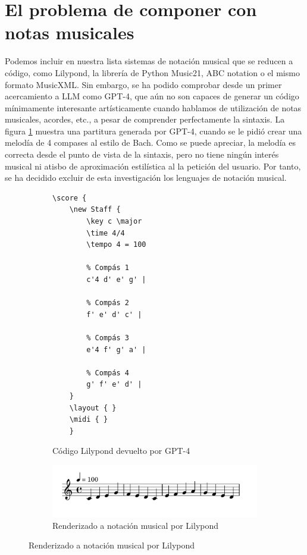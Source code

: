     
\section{El problema de componer con notas musicales}

Podemos incluir en nuestra lista sistemas de notación musical que se reducen a código, como Lilypond, la librería de Python Music21, ABC notation o el mismo formato MusicXML. Sin embargo, se ha podido comprobar desde un primer acercamiento a LLM como GPT-4, que aún no son capaces de generar un código mínimamente interesante artísticamente cuando hablamos de utilización de notas musicales, acordes, etc., a pesar de comprender perfectamente la sintaxis. La figura \ref{fig:melodia_bach} muestra una partitura generada por GPT-4, cuando se le pidió crear una melodía de 4 compases al estilo de Bach. Como se puede apreciar, la melodía es correcta desde el punto de vista de la sintaxis, pero no tiene ningún interés musical ni atisbo de aproximación estilística al la petición del usuario. Por tanto, se ha decidido excluir de esta investigación los lenguajes de notación musical.

\begin{figure}[h]
    \caption[Melodía de 4 compases generada por GPT-4, al estilo de Bach]{Melodía de 4 compases generada por GPT-4, al estilo de Bach. El LLM la entregó en formato Lilypond.}
    \centering
    \begin{subfigure}{.48\textwidth}
        \centering
        \begin{mdframed}
        \begin{verbatim}
\score {
    \new Staff {
        \key c \major
        \time 4/4
        \tempo 4 = 100
    
        % Compás 1
        c'4 d' e' g' |
    
        % Compás 2
        f' e' d' c' |
    
        % Compás 3
        e'4 f' g' a' |
    
        % Compás 4
        g' f' e' d' |
    }
    \layout { }
    \midi { }
    }
        \end{verbatim}
        \end{mdframed}
        \caption{Código Lilypond devuelto por GPT-4}
      \end{subfigure} \hfill

      \vspace{5mm} %

      \begin{subfigure}{.48\textwidth}
        \centering
        \includegraphics[width=1\textwidth]{./figuras/melodia_bach_estilo.png}
        \caption{Renderizado a notación musical por Lilypond}
      \end{subfigure}\hfill
    \label{fig:melodia_bach}
\end{figure}

